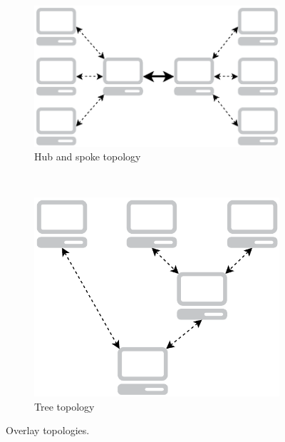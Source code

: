 \begin{figure}[h]
        \centering
        \begin{subfigure}[b]{0.5\textwidth}
                \centering
                \includegraphics[width=\textwidth]{./figures/hubandspoke.pdf}
                \caption{Hub and spoke topology}
                \label{fig:hubandspoke}
        \end{subfigure}%
        ~ %
        \begin{subfigure}[b]{0.5\textwidth}
                \centering
                \includegraphics[width=\textwidth]{./figures/three.pdf}
                \caption{Tree topology}
                \label{fig:three}
        \end{subfigure}
        \caption[Overlay topologies]{Overlay topologies.}
        \label{fig:overlaytopologies}
\end{figure}

